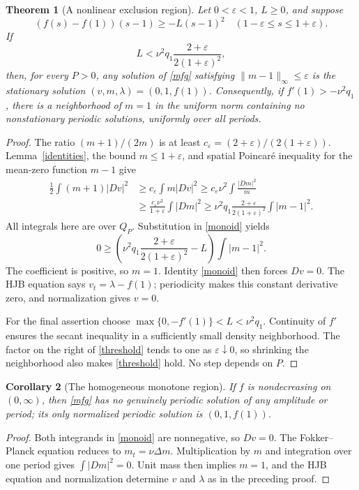 \documentclass[11pt]{article}
\newtheorem{theorem}{Theorem}
\newtheorem{corollary}[theorem]{Corollary}
\begin{document}
\begin{theorem}[A nonlinear exclusion region]\label{exclude}
Let $0<\varepsilon<1$, $L\geq0$, and suppose
\[
 (f(s)-f(1))(s-1)\geq-L(s-1)^2
       \quad(1-\varepsilon\leq s\leq1+\varepsilon).
\]
If
\begin{equation}\label{threshold}
 L<\nu^2q_1\frac{2+\varepsilon}{2(1+\varepsilon)^2},
\end{equation}
then, for every $P>0$, any solution of \eqref{mfg} satisfying
$\|m-1\|_\infty\leq\varepsilon$ is the stationary solution
$(v,m,\lambda)=(0,1,f(1))$.
Consequently, if $f'(1)>-\nu^2q_1$, there is a neighborhood of $m=1$
in the uniform norm containing no nonstationary periodic solutions,
uniformly over all periods.
\end{theorem}
\begin{proof}
The ratio $(m+1)/(2m)$ is at least
$c_\varepsilon=(2+\varepsilon)/(2(1+\varepsilon))$.
Lemma~\ref{identities}, the bound $m\leq1+\varepsilon$, and spatial
Poincar\'e inequality for the mean-zero function $m-1$ give
\begin{align*}
 \tfrac12\int(m+1)|Dv|^2
 &\geq c_\varepsilon\int m|Dv|^2
 \geq c_\varepsilon\nu^2\int\frac{|Dm|^2}{m}\\
 &\geq\frac{c_\varepsilon\nu^2}{1+\varepsilon}\int|Dm|^2
 \geq\nu^2q_1\frac{2+\varepsilon}{2(1+\varepsilon)^2}
                              \int|m-1|^2.
\end{align*}
All integrals here are over $Q_P$. Substitution in \eqref{monoid} yields
\[
 0\geq\left(\nu^2q_1\frac{2+\varepsilon}{2(1+\varepsilon)^2}-L\right)
                              \int|m-1|^2.
\]
The coefficient is positive, so $m=1$. Identity \eqref{monoid} then
forces $Dv=0$. The HJB equation says $v_t=\lambda-f(1)$;
periodicity makes this constant derivative zero, and normalization gives
$v=0$.

For the final assertion choose
$\max\{0,-f'(1)\}<L<\nu^2q_1$.
Continuity of $f'$ ensures the secant inequality in a sufficiently small
density neighborhood. The factor on the right of \eqref{threshold}
tends to one as $\varepsilon\downarrow0$, so shrinking the neighborhood
also makes \eqref{threshold} hold. No step depends on $P$.
\end{proof}

\begin{corollary}[The homogeneous monotone region]
If $f$ is nondecreasing on $(0,\infty)$, then \eqref{mfg} has no
genuinely periodic solution of any amplitude or period; its only
normalized periodic solution is $(0,1,f(1))$.
\end{corollary}
\begin{proof}
Both integrands in \eqref{monoid} are nonnegative, so $Dv=0$.
The Fokker--Planck equation reduces to $m_t=\nu\Delta m$.
Multiplication by $m$ and integration over one period gives
$\int|Dm|^2=0$. Unit mass then implies $m=1$, and the HJB equation
and normalization determine $v$ and $\lambda$ as in the preceding proof.
\end{proof}
\end{document}
